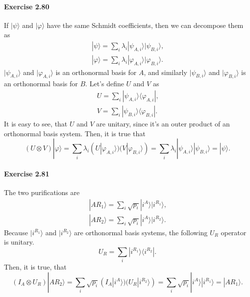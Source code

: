 \documentclass[a4paper,12pt]{article}
\newcommand{\exercise}[1]{\paragraph{Exercise #1}}
\newcommand{\la}{\langle}
\newcommand{\ra}{\rangle}
\begin{document}
    \exercise{2.80} If $| \psi \ra$ and $| \varphi \ra$ have the same Schmidt coefficients, then we can decompose them as
    \begin{gather}
        \nonumber
        | \psi \ra = \sum_i \lambda_i | \psi_{A, i} \ra | \psi_{B, i} \ra \textrm{,} \\
        | \varphi \ra = \sum_i \lambda_i | \varphi_{A, i} \ra | \varphi_{B, i} \ra \textrm{.}
    \end{gather}
    $| \psi_{A, i} \ra$ and $| \varphi_{A, i} \ra$ is an orthonormal basis for $A$, and similarly 
    $| \psi_{B, i} \ra$ and $| \varphi_{B, i} \ra$ is an orthonormal basis for $B$. Let's define $U$ and $V$ as
    \begin{gather}
        \nonumber
        U = \sum_i | \psi_{A, i} \ra \la \varphi_{A, i} | \textrm{,} \\
        V = \sum_i | \psi_{B, i} \ra \la \varphi_{B, i} | \textrm{.}
    \end{gather}
    It is easy to see, that $U$ and $V$ are unitary, since it's an outer product of an orthonormal basis system. Then, it is true that
    \begin{equation}
        (U \otimes V) | \varphi \ra = \sum_i \lambda_i (U | \varphi_{A, i} \ra) (V | \varphi_{B, i} \ra) =
        \sum_i \lambda_i | \psi_{A, i} \ra | \psi_{B, i} \ra = | \psi \ra \textrm{.}
    \end{equation}

    \exercise{2.81} The two purifications are
    \begin{gather}
        \nonumber
        | A R_1 \ra = \sum_i \sqrt{p_i} | i^A \ra | i^{R_1} \ra \textrm{,} \\
        | A R_2 \ra = \sum_i \sqrt{p_i} | i^A \ra | i^{R_2} \ra \textrm{.}
    \end{gather}
    Because $|i^{R_1} \ra$ and $|i^{R_2} \ra$ are orthonormal basis systems, the following $U_R$ operator is unitary.
    \begin{equation}
        U_R = \sum_i | i^{R_1} \ra \la i^{R_2} | \textrm{.}
    \end{equation}
    Then, it is true, that
    \begin{equation}
        (I_A \otimes U_R) |A R_2 \ra = \sum_i \sqrt{p_i} (I_A | i^A \ra) (U_R |i^{R_2} \ra) =
        \sum_i \sqrt{p_i} | i^A \ra | i^{R_1} \ra = | A R_1 \ra \textrm{.}
    \end{equation}
\end{document}

